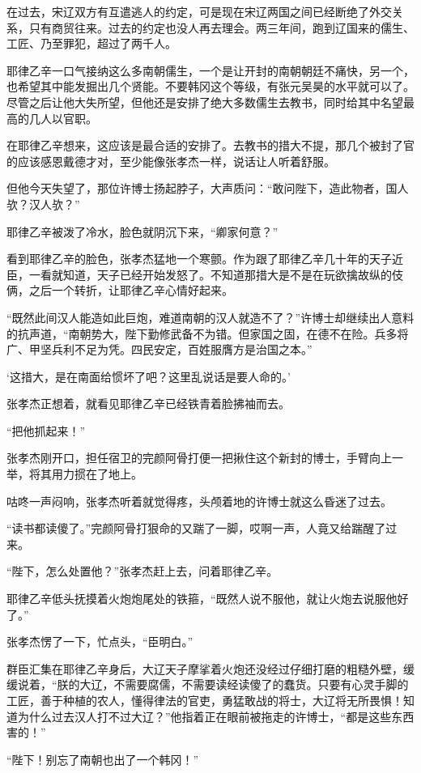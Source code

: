 在过去，宋辽双方有互遣逃人的约定，可是现在宋辽两国之间已经断绝了外交关系，只有商贸往来。过去的约定也没人再去理会。两三年间，跑到辽国来的儒生、工匠、乃至罪犯，超过了两千人。

耶律乙辛一口气接纳这么多南朝儒生，一个是让开封的南朝朝廷不痛快，另一个，也希望其中能发掘出几个贤能。不要韩冈这个等级，有张元吴昊的水平就可以了。尽管之后让他大失所望，但他还是安排了绝大多数儒生去教书，同时给其中名望最高的几人以官职。

在耶律乙辛想来，这应该是最合适的安排了。去教书的措大不提，那几个被封了官的应该感恩戴德才对，至少能像张孝杰一样，说话让人听着舒服。

但他今天失望了，那位许博士扬起脖子，大声质问：“敢问陛下，造此物者，国人欤？汉人欤？”

耶律乙辛被泼了冷水，脸色就阴沉下来，“卿家何意？”

看到耶律乙辛的脸色，张孝杰猛地一个寒颤。作为跟了耶律乙辛几十年的天子近臣，一看就知道，天子已经开始发怒了。不知道那措大是不是在玩欲擒故纵的伎俩，之后一个转折，让耶律乙辛心情好起来。

“既然此间汉人能造如此巨炮，难道南朝的汉人就造不了？”许博士却继续出人意料的抗声道，“南朝势大，陛下勤修武备不为错。但家国之固，在德不在险。兵多将广、甲坚兵利不足为凭。四民安定，百姓服膺方是治国之本。”

‘这措大，是在南面给惯坏了吧？这里乱说话是要人命的。’

张孝杰正想着，就看见耶律乙辛已经铁青着脸拂袖而去。

“把他抓起来！”

张孝杰刚开口，担任宿卫的完颜阿骨打便一把揪住这个新封的博士，手臂向上一举，将其用力掼在了地上。

咕咚一声闷响，张孝杰听着就觉得疼，头颅着地的许博士就这么昏迷了过去。

“读书都读傻了。”完颜阿骨打狠命的又踹了一脚，哎啊一声，人竟又给踹醒了过来。

“陛下，怎么处置他？”张孝杰赶上去，问着耶律乙辛。

耶律乙辛低头抚摸着火炮炮尾处的铁箍，“既然人说不服他，就让火炮去说服他好了。”

张孝杰愣了一下，忙点头，“臣明白。”

群臣汇集在耶律乙辛身后，大辽天子摩挲着火炮还没经过仔细打磨的粗糙外壁，缓缓说着，“朕的大辽，不需要腐儒，不需要读经读傻了的蠢货。只要有心灵手脚的工匠，善于种植的农人，懂得律法的官吏，勇猛敢战的将士，大辽将无所畏惧！知道为什么过去汉人打不过大辽？”他指着正在眼前被拖走的许博士，“都是这些东西害的！”

“陛下！别忘了南朝也出了一个韩冈！”

